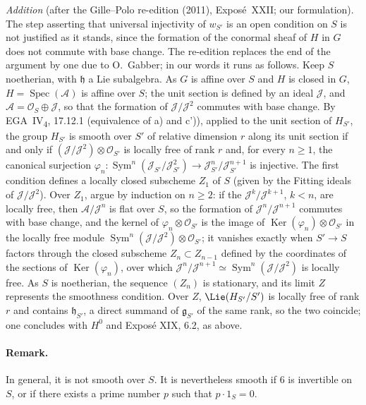 \emph{Addition} (after the Gille--Polo re-edition (2011), Exposé~XXII; our
formulation). The step asserting that universal injectivity of \(w_{S'}\)
is an open condition on \(S\) is not justified as it stands, since the
formation of the conormal sheaf of \(H\) in \(G\) does not commute with base
change. The re-edition replaces the end of the argument by one due to
O.~Gabber; in our words it runs as follows. Keep \(S\) noetherian, with
\(\mathfrak h\) a Lie subalgebra. As \(G\) is affine over \(S\) and \(H\) is
closed in \(G\), \(H=\operatorname{Spec}(\mathscr A)\) is affine over \(S\);
the unit section is defined by an ideal \(\mathscr J\), and
\(\mathscr A=\mathcal O_S\oplus\mathscr J\), so that the formation of
\(\mathscr J/\mathscr J^2\) commutes with base change. By
EGA~IV\textsubscript{4}, 17.12.1 (equivalence of a) and c')), applied to the
unit section of \(H_{S'}\), the group \(H_{S'}\) is smooth over \(S'\) of
relative dimension \(r\) along its unit section if and only if
\((\mathscr J/\mathscr J^2)\otimes\mathcal O_{S'}\) is locally free of rank
\(r\) and, for every \(n\geq1\), the canonical surjection
\(\varphi_n\colon\operatorname{Sym}^n(\mathscr J_{S'}/\mathscr J_{S'}^2)\to
\mathscr J_{S'}^n/\mathscr J_{S'}^{n+1}\) is injective. The first condition
defines a locally closed subscheme \(Z_1\) of \(S\) (given by the Fitting
ideals of \(\mathscr J/\mathscr J^2\)). Over \(Z_1\), argue by induction on
\(n\geq2\): if the \(\mathscr J^k/\mathscr J^{k+1}\), \(k<n\), are locally
free, then \(\mathscr A/\mathscr J^n\) is flat over \(S\), so the formation of
\(\mathscr J^n/\mathscr J^{n+1}\) commutes with base change, and the kernel of
\(\varphi_n\otimes\mathcal O_{S'}\) is the image of
\(\operatorname{Ker}(\varphi_n)\otimes\mathcal O_{S'}\) in the locally free
module \(\operatorname{Sym}^n(\mathscr J/\mathscr J^2)\otimes\mathcal O_{S'}\);
it vanishes exactly when \(S'\to S\) factors through the closed subscheme
\(Z_n\subset Z_{n-1}\) defined by the coordinates of the sections of
\(\operatorname{Ker}(\varphi_n)\), over which
\(\mathscr J^n/\mathscr J^{n+1}\simeq\operatorname{Sym}^n(\mathscr J/\mathscr J^2)\)
is locally free. As \(S\) is noetherian, the sequence \((Z_n)\) is
stationary, and its limit \(Z\) represents the smoothness condition. Over
\(Z\), \(\Lie(H_{S'}/S')\) is locally free of rank \(r\) and contains
\(\mathfrak h_{S'}\), a direct summand of \(\mathfrak g_{S'}\) of the same
rank, so the two coincide; one concludes with \(H^0\) and Exposé XIX, 6.2, as
above.

\paragraph{Remark.}
In general, it is not smooth over \(S\). It
is nevertheless smooth if \(6\) is invertible on \(S\), or if
there exists a prime number \(p\) such that \(p\cdot1_S=0\).

